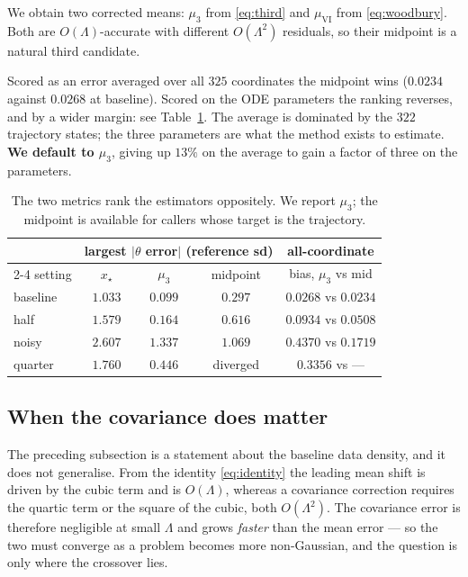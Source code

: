 \documentclass[11pt]{article}
\newcommand{\xmap}{x_{\star}}
\theoremstyle{plain}
\theoremstyle{definition}
\theoremstyle{remark}
\begin{document}
We obtain two corrected means: $\mu_3$ from \eqref{eq:third} and $\mu_{\text{VI}}$ from
\eqref{eq:woodbury}. Both are $O(\Lambda)$-accurate with different $O(\Lambda^2)$ residuals, so
their midpoint is a natural third candidate.

Scored as an error averaged over all $325$ coordinates the midpoint wins ($0.0234$ against $0.0268$
at baseline). Scored on the ODE parameters the ranking reverses, and by a wider margin: see
Table~\ref{tab:estimator}. The average is dominated by the $322$ trajectory states; the three
parameters are what the method exists to estimate. \textbf{We default to $\mu_3$}, giving up $13\%$
on the average to gain a factor of three on the parameters.

\begin{table}[t]
\centering
\small
\begin{tabular}{lcccc}
\toprule
& \multicolumn{3}{c}{largest $|\theta$ error$|$ (reference sd)} & all-coordinate \\
\cmidrule(lr){2-4}
setting & $\xmap$ & $\mu_3$ & midpoint & bias, $\mu_3$ vs mid \\
\midrule
baseline & $1.033$ & $\mathbf{0.099}$ & $0.297$ & $0.0268$ vs $\mathbf{0.0234}$\\
half     & $1.579$ & $\mathbf{0.164}$ & $0.616$ & $0.0934$ vs $\mathbf{0.0508}$\\
noisy    & $2.607$ & $1.337$ & $\mathbf{1.069}$ & $0.4370$ vs $\mathbf{0.1719}$\\
quarter  & $1.760$ & $\mathbf{0.446}$ & diverged & $0.3356$ vs --- \\
\bottomrule
\end{tabular}
\caption{The two metrics rank the estimators oppositely. We report $\mu_3$; the midpoint is
available for callers whose target is the trajectory.}
\label{tab:estimator}
\end{table}

\subsection{When the covariance does matter}
\label{sec:covscaling}

The preceding subsection is a statement about the baseline data density, and it does not
generalise. From the identity \eqref{eq:identity} the leading mean shift is driven by the cubic
term and is $O(\Lambda)$, whereas a covariance correction requires the quartic term or the square
of the cubic, both $O(\Lambda^{2})$. The covariance error is therefore negligible at small
$\Lambda$ and grows \emph{faster} than the mean error --- so the two must converge as a problem
becomes more non-Gaussian, and the question is only where the crossover lies.
\end{document}
